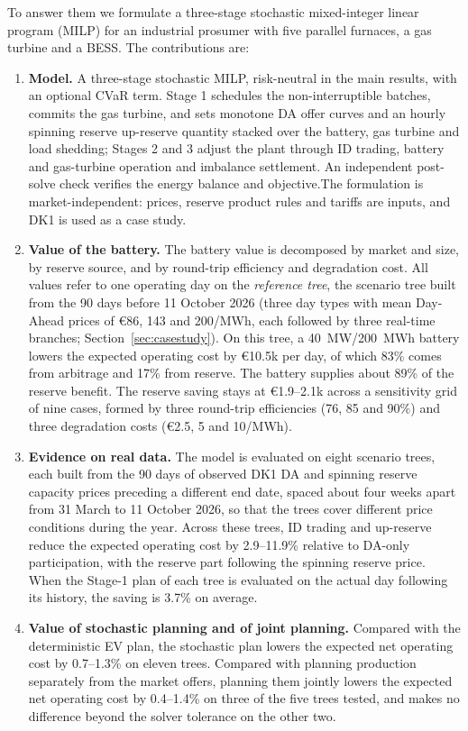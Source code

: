 \documentclass[5p,times,twocolumn]{elsarticle}
\begin{document}
To answer them we formulate a three-stage stochastic mixed-integer linear program (MILP) for an industrial prosumer with five parallel furnaces, a gas turbine and a BESS. The contributions are:
\begin{enumerate}
    \item \textbf{Model.} A three-stage stochastic MILP, risk-neutral in the main results, with an optional CVaR term. Stage 1 schedules the non-interruptible batches, commits the gas turbine, and sets monotone DA offer curves and an hourly spinning reserve  up-reserve quantity stacked over the battery, gas turbine and load shedding; Stages 2 and 3 adjust the plant through ID trading, battery and gas-turbine operation and imbalance settlement. An independent post-solve check verifies the energy balance and objective.The formulation is market-independent: prices, reserve product rules and tariffs are inputs, and DK1 is used as a case study.
    \item \textbf{Value of the battery.} The battery value is decomposed by market and size, by reserve source, and by round-trip efficiency and degradation cost. All values refer to one operating day on the \emph{reference tree}, the scenario tree built from the 90 days before 11 October 2026 (three day types with mean Day-Ahead prices of \euro 86, 143 and 200/MWh, each followed by three real-time branches; Section~\ref{sec:casestudy}). On this tree, a 40~MW/200~MWh battery lowers the expected operating cost by \euro 10.5k per day, of which 83\% comes from arbitrage and 17\% from reserve. The battery supplies about 89\% of the reserve benefit. The reserve saving stays at \euro 1.9--2.1k across a sensitivity grid of nine cases, formed by three round-trip efficiencies (76, 85 and 90\%) and three degradation costs (\euro 2.5, 5 and 10/MWh).
   \item \textbf{Evidence on real data.} The model is evaluated on eight scenario trees, each built from the 90 days of observed DK1 DA and spinning reserve capacity prices preceding a different end date, spaced about four weeks apart from 31 March to 11 October 2026, so that the trees cover different price conditions during the year. Across these trees, ID trading and up-reserve reduce the expected operating cost by 2.9--11.9\% relative to DA-only participation, with the reserve part following the spinning reserve price. When the Stage-1 plan of each tree is evaluated on the actual day following its history, the saving is 3.7\% on average.
   \item \textbf{Value of stochastic planning and of joint planning.} Compared with the deterministic EV plan, the stochastic plan lowers the expected net operating cost by 0.7--1.3\% on eleven trees. Compared with planning production separately from the market offers, planning them jointly lowers the expected net operating cost by 0.4--1.4\% on three of the five trees tested, and makes no difference beyond the solver tolerance on the other two.
\end{enumerate}
\end{document}
